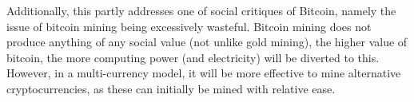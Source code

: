 \begin{refsection}
Additionally, this partly addresses one of social critiques of Bitcoin,
namely the issue of bitcoin mining being excessively wasteful.
Bitcoin mining does not produce anything of any social value (not unlike gold mining),
the higher value of bitcoin, the more computing power (and electricity) will be diverted to this.
However, in a multi-currency model, it will be more effective to mine alternative cryptocurrencies,
as these can initially be mined with relative ease.



\printbibliography
\end{refsection}
